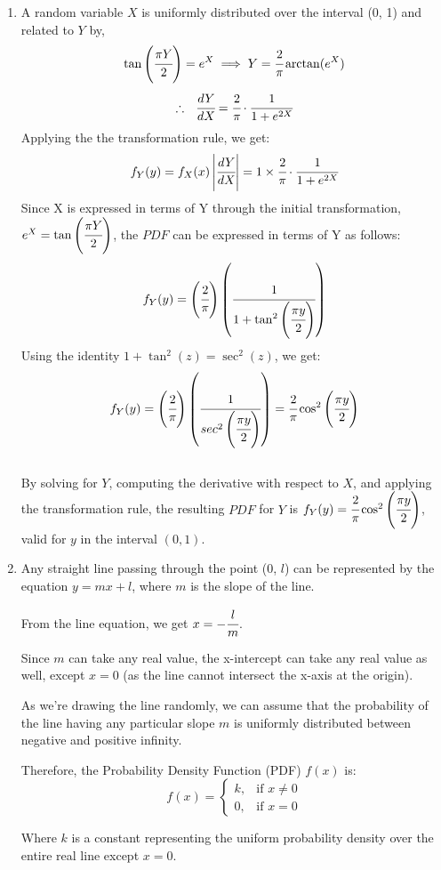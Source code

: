 \documentclass{article}
\begin{document}
\begin{enumerate}
\newpage
\item 
    A random variable \(X\) is uniformly distributed over the interval (0, 1) and related to \(Y\) by,
    \[
        \tan\left(\cfrac{\pi Y}{2}\right) = e^X \implies Y = \cfrac{2}{\pi}\arctan(e^X)
    \]
    \[
        \therefore\ \ \cfrac{dY}{dX} = \cfrac{2}{\pi}\cdot\cfrac{1}{1+e^{2X}}
    \]
    Applying the the transformation rule, we get:
    \[
        f_Y(y) = f_X(x)\left|\cfrac{dY}{dX}\right| = 1 \times \cfrac{2}{\pi}\cdot\cfrac{1}{1+e^{2X}}
    \]
    Since X is expressed in terms of Y through the initial transformation, $e^X = \tan\left(\cfrac{\pi Y}{2}\right)$, the \(PDF\) can be expressed in terms of Y as follows:
    \[
        f_Y(y) = \left(\cfrac{2}{\pi}\right)\left(\cfrac{1}{1+\tan^2\left(\cfrac{\pi y}{2}\right)}\right)
    \]
    Using the identity $1 + \tan^2(z) = \sec^2(z)$, we get:
    \[
        f_Y(y) = \left(\cfrac{2}{\pi}\right)\left(\cfrac{1}{sec^2\left(\cfrac{\pi y}{2}\right)}\right) = \cfrac{2}{\pi}\cos^2\left(\cfrac{\pi y}{2}\right)
    \]\\
    By solving for \(Y\), computing the derivative with respect to \(X\), and applying the transformation rule, the resulting \(PDF\) for \(Y\) is $f_Y(y) = \cfrac{2}{\pi}\cos^2\left(\cfrac{\pi y}{2}\right)$, valid for \(y\) in the interval $(0, 1)$.
    
\newpage
\item
    Any straight line passing through the point (0, \(l\)) can be represented by the equation $y = mx + l$, where $m$ is the slope of the line.

    From the line equation, we get $x = -\cfrac{l}{m}$.

    Since $m$ can take any real value, the x-intercept can take any real value as well, except $x=0$ (as the line cannot intersect the x-axis at the origin).
    
    As we're drawing the line randomly, we can assume that the probability of the line having any particular slope $m$ is uniformly distributed between negative and positive infinity.

    Therefore, the Probability Density Function (PDF) $f(x)$ is:
    \[
    f(x) = \begin{cases}
    k, & \text{if } x \neq 0\\
    0, & \text{if } x = 0
    \end{cases}
    \]

    Where $k$ is a constant representing the uniform probability density over the entire real line except $x = 0$.


\end{enumerate}
\end{document}
